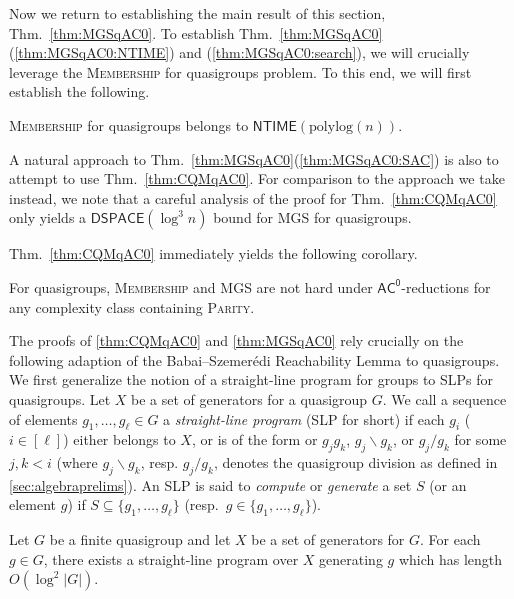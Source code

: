 \documentclass{theoretics}
\newcommand{\algprobm}[1]{\textsc{#1}\xspace}
\newcommand{\Thm}[1]{Thm.~\ref{#1}\xspace}
\newcommand*{\ComplexityClass}[1]{\ensuremath{\mathsf{#1}}\xspace}
\newcommand{\ACz}{\ComplexityClass{AC^0}}
\newcommand{\NTIME}{\ComplexityClass{NTIME}}
\begin{document}
Now we return to establishing the main result of this section, \Thm{thm:MGSqAC0}. To establish \Thm{thm:MGSqAC0}(\ref{thm:MGSqAC0:NTIME}) and (\ref{thm:MGSqAC0:search}), we will crucially leverage the \algprobm{Membership} for quasigroups problem. To this end, we will first establish the following.

\begin{theorem}\label{thm:CQMqAC0}
\algprobm{Membership} for quasigroups belongs to $\NTIME(\mathrm{polylog}(n))$.
\end{theorem}

\begin{remark}
 A natural approach to \Thm{thm:MGSqAC0}(\ref{thm:MGSqAC0:SAC}) is also to attempt to use \Thm{thm:CQMqAC0}. For comparison to the approach we take instead, we note that a careful analysis of the proof for \Thm{thm:CQMqAC0} only yields a $\mathsf{DSPACE}(\log^3 n)$ bound for \algprobm{MGS} for quasigroups.
\end{remark}

\Thm{thm:CQMqAC0} immediately yields the following corollary. 

\begin{corollary}
For quasigroups, \algprobm{Membership} and \algprobm{MGS} are not hard under $\ACz$-reductions for any complexity class containing \algprobm{Parity}.
\end{corollary}

The proofs of \cref{thm:CQMqAC0} and \cref{thm:MGSqAC0} rely crucially on the following adaption of the Babai--Szemer\'edi  Reachability Lemma \cite[Theorem~3.1]{BabaiSzemeredi} to quasigroups. We first generalize the notion of a straight-line program for groups \cite{BabaiSzemeredi} to SLPs for quasigroups. Let $X$ be a set of generators for a quasigroup $G$. We call a sequence of elements $g_{1}, \ldots, g_{\ell} \in G$ a \textit{straight-line program} (SLP for short) if each $g_{i}$ ($i \in [\ell]$) either belongs to $X$, or is of the form or $g_{j}g_{k}$, $g_{j}\backslash g_{k}$, or $g_{j}/ g_{k}$ for some $j, k < i$ (where $g_{j}\backslash g_{k}$, resp. $g_{j}/ g_{k}$, denotes the quasigroup division as defined in \cref{sec:algebraprelims}). An SLP is said to \emph{compute} or \emph{generate} a set $S$ (or an element $g$) if $S \subseteq \{g_1, \dots, g_\ell\}$ (resp.\ $g\in\{g_1, \dots, g_\ell\}$).

\begin{lemma} \label{lem:Reachability}
Let $G$ be a finite quasigroup and let $X$ be a set of generators for $G$. For each $g \in G$, there exists a straight-line program over $X$ generating $g$ which has length $O(\log^2 |G|)$.
\end{lemma}
\end{document}

